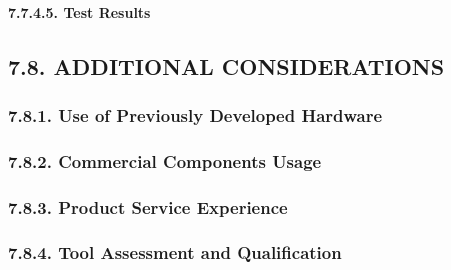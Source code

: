 \documentclass[
]{article}
\begin{document}
\hypertarget{test-results-1}{%
\paragraph{7.7.4.5. Test Results}\label{test-results-1}}

\hypertarget{additional-considerations-1}{%
\subsection{7.8. ADDITIONAL
CONSIDERATIONS}\label{additional-considerations-1}}

\hypertarget{use-of-previously-developed-hardware-1}{%
\subsubsection{7.8.1. Use of Previously Developed
Hardware}\label{use-of-previously-developed-hardware-1}}

\hypertarget{commercial-components-usage-1}{%
\subsubsection{7.8.2. Commercial Components
Usage}\label{commercial-components-usage-1}}

\hypertarget{product-service-experience-1}{%
\subsubsection{7.8.3. Product Service
Experience}\label{product-service-experience-1}}

\hypertarget{tool-assessment-and-qualification-1}{%
\subsubsection{7.8.4. Tool Assessment and
Qualification}\label{tool-assessment-and-qualification-1}}
\end{document}
